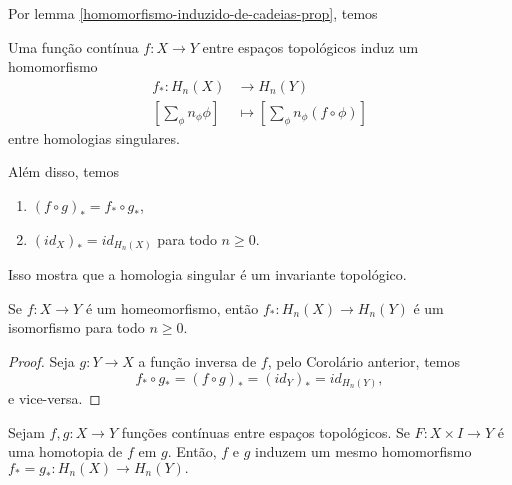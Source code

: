 Por lemma \ref{homomorfismo-induzido-de-cadeias-prop}, temos 

\begin{corol}
    Uma função contínua $f:X\rightarrow Y$ entre espaços topológicos induz um homomorfismo 
    \begin{align*}
        f_*: H_n(X)&\longrightarrow H_n(Y)\\
        [\sum_\phi n_\phi \phi]&\longmapsto [\sum_\phi n_\phi (f\circ \phi)]
    \end{align*} 
    entre homologias singulares.

    Além disso, temos 
    \begin{enumerate}
        \item $(f\circ g)_*=f_*\circ g_*$,
        \item $(id_X)_*=id_{H_n(X)}$ para todo $n\ge 0$.
    \end{enumerate}
\end{corol}
Isso mostra que a homologia singular é um invariante topológico.
\begin{corol}
    Se $f:X\rightarrow Y$ é um homeomorfismo, então $f_*:H_n(X)\rightarrow H_n(Y)$ é um isomorfismo para todo $n\ge 0$. 
\end{corol}

\begin{proof}
    Seja $g:Y\rightarrow X$ a função inversa de $f$, pelo Corolário anterior, temos 
    \[f_*\circ g_*=(f\circ g)_*=(id_Y)_*=id_{H_n(Y)},\]
    e vice-versa.
\end{proof}

\begin{thm}
    Sejam $f,g:X\rightarrow Y$ funções contínuas entre espaços topológicos. Se $F:X\times I\rightarrow Y$ é uma homotopia de $f$ em $g$. Então, $f$ e $g$ induzem um mesmo homomorfismo $f_*=g_*:H_n(X)\rightarrow H_n(Y).$
\end{thm}


